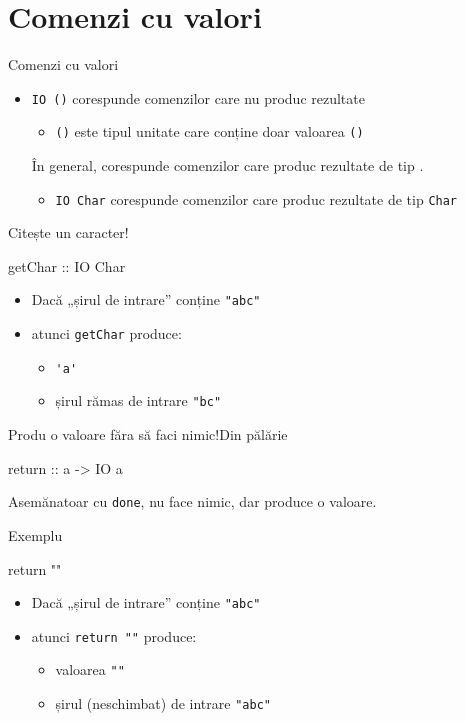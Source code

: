 \documentclass[xcolor=pdftex,romanian,colorlinks]{beamer}
\begin{document}
\section{Comenzi cu valori}

\begin{frame}[fragile]{Comenzi cu valori}
\begin{itemize}
\item \lstinline$IO ()$ corespunde comenzilor care nu produc rezultate
\begin{itemize}
\item \lstinline$()$ este tipul unitate care conține doar valoarea \lstinline$()$
\end{itemize}
\vitem În general,   corespunde comenzilor care produc rezultate de tip .
\begin{itemize}
\item \lstinline$IO Char$ corespunde comenzilor care produc rezultate de tip \lstinline$Char$
\end{itemize}
\end{itemize}
\end{frame}


\begin{frame}[fragile]{Citește un caracter!}
\begin{asciihs}
   getChar :: IO Char
\end{asciihs}

\begin{itemize}
\item Dacă „șirul de intrare” conține \lstinline$"abc"$
\item atunci \lstinline$getChar$ produce:
\begin{itemize}
\item \lstinline$'a'$ 
\item șirul rămas de intrare \lstinline$"bc"$
\end{itemize}
\end{itemize}
\end{frame}


\begin{frame}[fragile]{Produ o valoare făra să faci nimic!}{Din pălărie}
\begin{asciihs}
   return :: a -> IO a
\end{asciihs}

Asemănatoar cu \lstinline$done$, nu face nimic, dar produce o valoare.
\begin{block}{Exemplu}
\begin{asciihs}
   return ""
\end{asciihs}
\begin{itemize}
\item Dacă „șirul de intrare” conține \lstinline$"abc"$
\item atunci \lstinline$return ""$ produce:
\begin{itemize}
\item valoarea \lstinline$""$ 
\item șirul (neschimbat) de intrare \lstinline$"abc"$
\end{itemize}
\end{itemize}
\end{block}
\end{frame}
\end{document}
